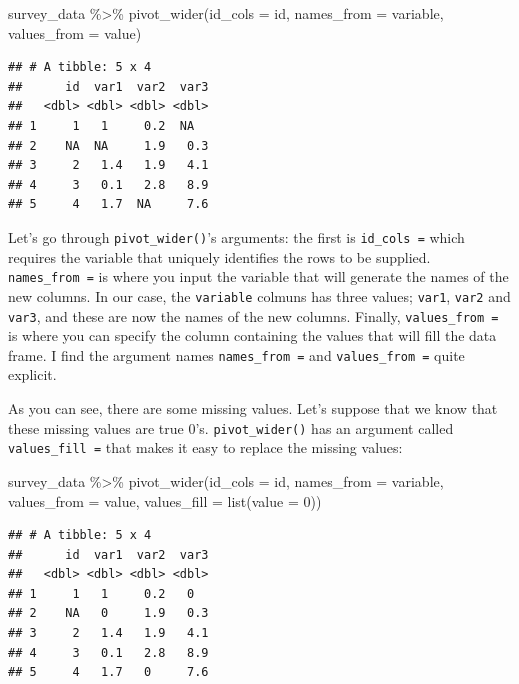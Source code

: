 \documentclass[
]{article}
\newenvironment{Shaded}{\begin{snugshade}}{\end{snugshade}}
\newcommand{\AttributeTok}[1]{\textcolor[rgb]{0.77,0.63,0.00}{#1}}
\newcommand{\DecValTok}[1]{\textcolor[rgb]{0.00,0.00,0.81}{#1}}
\newcommand{\FunctionTok}[1]{\textcolor[rgb]{0.00,0.00,0.00}{#1}}
\newcommand{\NormalTok}[1]{#1}
\newcommand{\SpecialCharTok}[1]{\textcolor[rgb]{0.00,0.00,0.00}{#1}}
\begin{document}
\begin{Shaded}
\begin{Highlighting}[]
\NormalTok{survey\_data }\SpecialCharTok{\%\textgreater{}\%} 
  \FunctionTok{pivot\_wider}\NormalTok{(}\AttributeTok{id\_cols =}\NormalTok{ id,}
              \AttributeTok{names\_from =}\NormalTok{ variable,}
              \AttributeTok{values\_from =}\NormalTok{ value)}
\end{Highlighting}
\end{Shaded}

\begin{verbatim}
## # A tibble: 5 x 4
##      id  var1  var2  var3
##   <dbl> <dbl> <dbl> <dbl>
## 1     1   1     0.2  NA  
## 2    NA  NA     1.9   0.3
## 3     2   1.4   1.9   4.1
## 4     3   0.1   2.8   8.9
## 5     4   1.7  NA     7.6
\end{verbatim}

Let's go through \texttt{pivot\_wider()}'s arguments: the first is \texttt{id\_cols\ =} which requires the variable
that uniquely identifies the rows to be supplied. \texttt{names\_from\ =} is where you input the variable that will
generate the names of the new columns. In our case, the \texttt{variable} colmuns has three values; \texttt{var1},
\texttt{var2} and \texttt{var3}, and these are now the names of the new columns. Finally, \texttt{values\_from\ =} is where
you can specify the column containing the values that will fill the data frame.
I find the argument names \texttt{names\_from\ =} and \texttt{values\_from\ =} quite explicit.

As you can see, there are some missing values. Let's suppose that we know that these missing values
are true 0's. \texttt{pivot\_wider()} has an argument called \texttt{values\_fill\ =} that makes it easy to replace
the missing values:

\begin{Shaded}
\begin{Highlighting}[]
\NormalTok{survey\_data }\SpecialCharTok{\%\textgreater{}\%} 
  \FunctionTok{pivot\_wider}\NormalTok{(}\AttributeTok{id\_cols =}\NormalTok{ id,}
              \AttributeTok{names\_from =}\NormalTok{ variable,}
              \AttributeTok{values\_from =}\NormalTok{ value,}
              \AttributeTok{values\_fill =} \FunctionTok{list}\NormalTok{(}\AttributeTok{value =} \DecValTok{0}\NormalTok{))}
\end{Highlighting}
\end{Shaded}

\begin{verbatim}
## # A tibble: 5 x 4
##      id  var1  var2  var3
##   <dbl> <dbl> <dbl> <dbl>
## 1     1   1     0.2   0  
## 2    NA   0     1.9   0.3
## 3     2   1.4   1.9   4.1
## 4     3   0.1   2.8   8.9
## 5     4   1.7   0     7.6
\end{verbatim}
\end{document}
